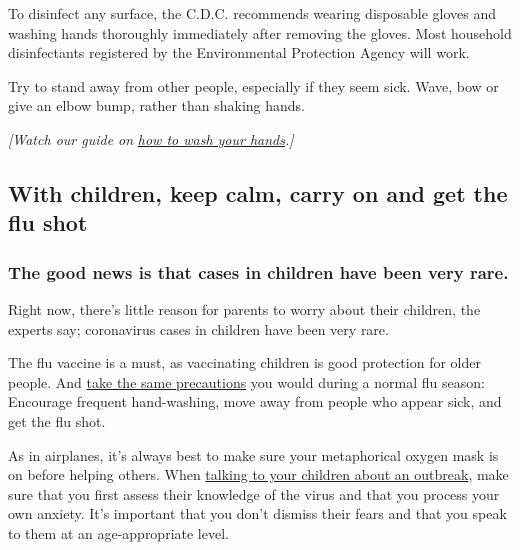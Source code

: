 To disinfect any surface, the C.D.C. recommends wearing disposable
gloves and washing hands thoroughly immediately after removing the
gloves. Most household disinfectants registered by the Environmental
Protection Agency will work.

Try to stand away from other people, especially if they seem sick. Wave,
bow or give an elbow bump, rather than shaking hands.

\emph{{[}Watch our guide on}
\href{https://www.nytimes3xbfgragh.onion/2020/03/13/world/how-to-wash-your-hands-coronavirus.html}{\emph{how
to wash your hands}}\emph{.{]}}

\hypertarget{with-children-keep-calm-carry-on-and-get-the-flu-shot}{%
\subsection{With children, keep calm, carry on and get the flu
shot}\label{with-children-keep-calm-carry-on-and-get-the-flu-shot}}

\hypertarget{the-good-news-is-that-cases-in-children-have-been-very-rare}{%
\subsubsection{\texorpdfstring{\textbf{The good news is that cases in
children have been very
rare.}}{The good news is that cases in children have been very rare.}}\label{the-good-news-is-that-cases-in-children-have-been-very-rare}}

Right now, there's little reason for parents to worry about their
children, the experts say; coronavirus cases in children have been very
rare.

The flu vaccine is a must, as vaccinating children is good protection
for older people. And
\href{https://www.nytimes3xbfgragh.onion/2020/03/09/parenting/coronavirus-parents-need-to-know.html}{take
the same precautions} you would during a normal flu season: Encourage
frequent hand-washing, move away from people who appear sick, and get
the flu shot.

As in airplanes, it's always best to make sure your metaphorical oxygen
mask is on before helping others. When
\href{https://parenting.nytimes3xbfgragh.onion/childrens-health/coronavirus-kids-talk}{talking
to your children about an outbreak}, make sure that you first assess
their knowledge of the virus and that you process your own anxiety. It's
important that you don't dismiss their fears and that you speak to them
at an age-appropriate level.

